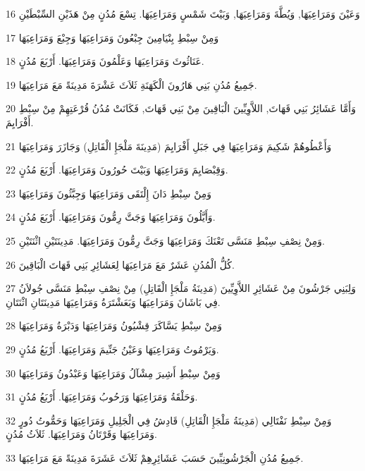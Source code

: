 \par 16 وَعَيْنَ وَمَرَاعِيَهَا, وَيُطَّةَ وَمَرَاعِيَهَا, وَبَيْتَ شَمْسٍ وَمَرَاعِيَهَا. تِسْعَ مُدُنٍ مِنْ هَذَيْنِ السِّبْطَيْنِ
\par 17 وَمِنْ سِبْطِ بِنْيَامِينَ جِبْعُونَ وَمَرَاعِيَهَا وَجِبْعَ وَمَرَاعِيَهَا
\par 18 عَنَاثُوثَ وَمَرَاعِيَهَا وَعَلْمُونَ وَمَرَاعِيَهَا. أَرْبَعَ مُدُنٍ.
\par 19 جَمِيعُ مُدُنِ بَنِي هَارُونَ الْكَهَنَةِ ثَلاَثَ عَشْرَةَ مَدِينَةً مَعَ مَرَاعِيَهَا.
\par 20 وَأَمَّا عَشَائِرُ بَنِي قَهَاتَ, اللاَّوِيِّينَ الْبَاقِينَ مِنْ بَنِي قَهَاتَ, فَكَانَتْ مُدُنُ قُرْعَتِهِمْ مِنْ سِبْطِ أَفْرَايِمَ.
\par 21 وَأَعْطُوهُمْ شَكِيمَ وَمَرَاعِيَهَا فِي جَبَلِ أَفْرَايِمَ (مَدِينَةَ مَلْجَإِ الْقَاتِلِ) وَجَازَرَ وَمَرَاعِيَهَا
\par 22 وَقِبْصَايِمَ وَمَرَاعِيَهَا وَبَيْتَ حُورُونَ وَمَرَاعِيَهَا. أَرْبَعَ مُدُنٍ.
\par 23 وَمِنْ سِبْطِ دَانَ إِلْتَقَى وَمَرَاعِيَهَا وَجِبَّثُونَ وَمَرَاعِيَهَا
\par 24 وَأَيَّلُونَ وَمَرَاعِيَهَا وَجَتَّ رِمُّونَ وَمَرَاعِيَهَا. أَرْبَعَ مُدُنٍ.
\par 25 وَمِنْ نِصْفِ سِبْطِ مَنَسَّى تَعْنَكَ وَمَرَاعِيَهَا وَجَتَّ رِمُّونَ وَمَرَاعِيَهَا. مَدِينَتَيْنِ اثْنَتَيْنِ.
\par 26 كُلُّ الْمُدُنِ عَشَرٌ مَعَ مَرَاعِيَهَا لِعَشَائِرِ بَنِي قَهَاتَ الْبَاقِينَ.
\par 27 وَلِبَنِي جَرْشُونَ مِنْ عَشَائِرِ اللاَّوِيِّينَ (مَدِينَةُ مَلْجَإِ الْقَاتِلِ) مِنْ نِصْفِ سِبْطِ مَنَسَّى جُولاَنُ فِي بَاشَانَ وَمَرَاعِيَهَا وَبَعَشْتَرَةُ وَمَرَاعِيَهَا مَدِينَتَانِ اثْنَتَانِ.
\par 28 وَمِنْ سِبْطِ يَسَّاكَرَ قِشْيُونُ وَمَرَاعِيَهَا وَدَبْرَةُ وَمَرَاعِيَهَا
\par 29 وَيَرْمُوتُ وَمَرَاعِيَهَا وَعَيْنُ جَنِّيمَ وَمَرَاعِيَهَا. أَرْبَعُ مُدُنٍ.
\par 30 وَمِنْ سِبْطِ أَشِيرَ مِشْآلُ وَمَرَاعِيَهَا وَعَبْدُونُ وَمَرَاعِيَهَا
\par 31 وَحَلْقَةُ وَمَرَاعِيَهَا وَرَحُوبُ وَمَرَاعِيَهَا. أَرْبَعُ مُدُنٍ.
\par 32 وَمِنْ سِبْطِ نَفْتَالِي (مَدِينَةُ مَلْجَإِ الْقَاتِلِ) قَادِشُ فِي الْجَلِيلِ وَمَرَاعِيَهَا وَحَمُّوتُ دُورٍ وَمَرَاعِيَهَا وَقَرْتَانُ وَمَرَاعِيَهَا. ثَلاَثُ مُدُنٍ.
\par 33 جَمِيعُ مُدُنِ الْجَرْشُونِيِّينَ حَسَبَ عَشَائِرِهِمْ ثَلاَثَ عَشَرَةَ مَدِينَةً مَعَ مَرَاعِيَهَا.
